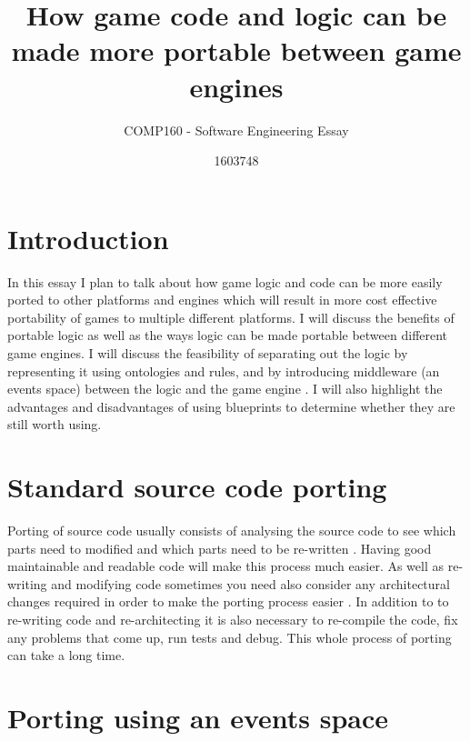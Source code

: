\documentclass{scrartcl}
\title{How game code and logic can be made more portable between game engines}
\subtitle{COMP160 - Software Engineering Essay}
\author{1603748}
\begin{document}
\maketitle


\section*{Introduction}
 
In this essay I plan to talk about how game logic and code can be more easily ported to other platforms and engines which will result in more cost effective portability of games to multiple different platforms. I will discuss the benefits of portable logic as well as the ways logic can be made portable between different game engines. I will discuss the feasibility of separating out the logic by representing it using ontologies and rules, and by introducing middleware (an events space) between the logic and the game engine \cite{GameLogic}. I will also highlight the advantages and disadvantages of using blueprints to determine whether they are still worth using.  

\section{Standard source code porting}

Porting of source code usually consists of analysing the source code to see which parts need to modified and which parts need to be re-written \cite{PortingSymbian}. Having good maintainable and readable code will make this process much easier. As well as re-writing and modifying code sometimes you need also consider any architectural changes required in order to make the porting process easier \cite{PortingSymbian}. In addition to to re-writing code and re-architecting it is also necessary to re-compile the code, fix any problems that come up, run tests and debug. This whole process of porting can take a long time.   

\section{Porting using an events space}
\end{document}
